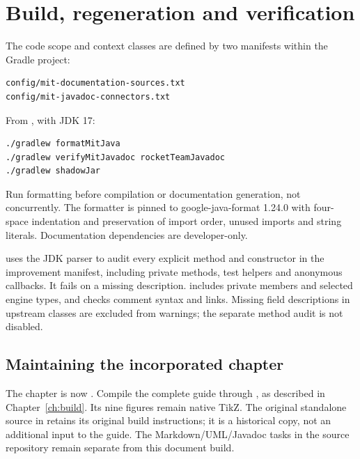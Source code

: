 \clearpage
\section{Build, regeneration and verification}
The code scope and context classes are defined by two manifests within the
Gradle project:
\begin{lstlisting}
config/mit-documentation-sources.txt
config/mit-javadoc-connectors.txt
\end{lstlisting}
From , with JDK 17:
\begin{lstlisting}[language=bash]
./gradlew formatMitJava
./gradlew verifyMitJavadoc rocketTeamJavadoc
./gradlew shadowJar
\end{lstlisting}
Run formatting before compilation or documentation generation, not
concurrently. The formatter is pinned to google-java-format 1.24.0 with
four-space indentation and preservation of import order, unused imports and
string literals. Documentation dependencies are developer-only.

 uses the JDK parser to audit every explicit method and
constructor in the improvement manifest, including private methods, test
helpers and anonymous callbacks. It fails on a missing description.
 includes private members and selected engine types,
and checks comment syntax and links. Missing field descriptions in upstream
classes are excluded from warnings; the separate method audit is not disabled.

\subsection{Maintaining the incorporated chapter}
The chapter is now . Compile the complete guide through , as described in Chapter~\ref{ch:build}. Its nine figures remain native TikZ. The original standalone source in  retains its original build instructions; it is a historical copy, not an additional input to the guide. The Markdown/UML/Javadoc tasks in the source repository remain separate from this document build.

